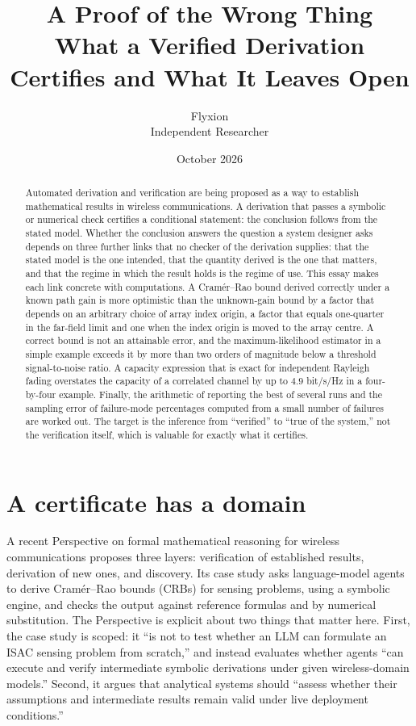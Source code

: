 \documentclass[11pt]{article}
\title{A Proof of the Wrong Thing\\[4pt]
\large What a Verified Derivation Certifies and What It Leaves Open}
\author{Flyxion\\Independent Researcher}
\date{October 2026}
\theoremstyle{definition}
\begin{document}
\maketitle

\begin{abstract}
\noindent
Automated derivation and verification are being proposed as a way to establish mathematical results in wireless communications. A derivation that passes a symbolic or numerical check certifies a conditional statement: the conclusion follows from the stated model. Whether the conclusion answers the question a system designer asks depends on three further links that no checker of the derivation supplies: that the stated model is the one intended, that the quantity derived is the one that matters, and that the regime in which the result holds is the regime of use. This essay makes each link concrete with computations. A Cram\'er--Rao bound derived correctly under a known path gain is more optimistic than the unknown-gain bound by a factor that depends on an arbitrary choice of array index origin, a factor that equals one-quarter in the far-field limit and one when the index origin is moved to the array centre. A correct bound is not an attainable error, and the maximum-likelihood estimator in a simple example exceeds it by more than two orders of magnitude below a threshold signal-to-noise ratio. A capacity expression that is exact for independent Rayleigh fading overstates the capacity of a correlated channel by up to $4.9$ bit/s/Hz in a four-by-four example. Finally, the arithmetic of reporting the best of several runs and the sampling error of failure-mode percentages computed from a small number of failures are worked out. The target is the inference from ``verified'' to ``true of the system,'' not the verification itself, which is valuable for exactly what it certifies.
\end{abstract}

\section{A certificate has a domain}

A recent Perspective on formal mathematical reasoning for wireless communications \citep{zhao2026} proposes three layers: verification of established results, derivation of new ones, and discovery. Its case study asks language-model agents to derive Cram\'er--Rao bounds (CRBs) for sensing problems, using a symbolic engine, and checks the output against reference formulas and by numerical substitution. The Perspective is explicit about two things that matter here. First, the case study is scoped: it ``is not to test whether an LLM can formulate an ISAC sensing problem from scratch,'' and instead evaluates whether agents ``can execute and verify intermediate symbolic derivations under given wireless-domain models.'' Second, it argues that analytical systems should ``assess whether their assumptions and intermediate results remain valid under live deployment conditions.''
\end{document}
